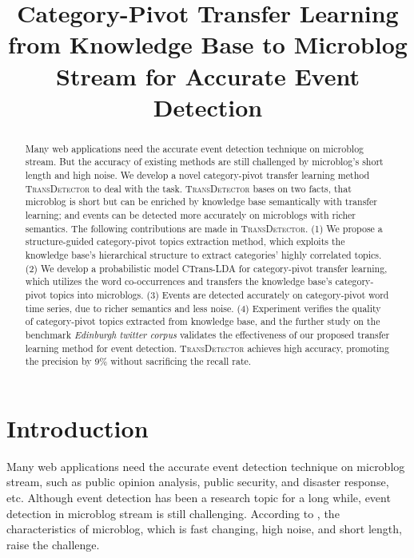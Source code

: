 \documentclass{article}
\begin{document}
%
\title{Category-Pivot Transfer Learning from Knowledge Base to Microblog Stream for Accurate Event Detection}
\maketitle

\begin{abstract}
Many web applications need the accurate event detection technique on microblog stream. 
But the accuracy of existing methods are still challenged by microblog's short length and high noise. 
We develop a novel category-pivot transfer learning method \textsc{TransDetector} to deal with the task.  
\textsc{TransDetector} bases on two facts, that microblog is short but can be enriched by knowledge base semantically with transfer learning; and events can be detected more accurately on microblogs with richer semantics.
The following contributions are made in \textsc{TransDetector}.
(1) We propose a structure-guided category-pivot topics extraction method, which exploits the knowledge base's hierarchical structure to extract categories' highly correlated topics. 
(2) We develop a probabilistic model CTrans-LDA for category-pivot transfer learning, which utilizes the word co-occurrences and transfers the knowledge base's category-pivot topics into microblogs. 
(3) Events are detected accurately on category-pivot word time series, due to richer semantics and less noise. 
(4) Experiment verifies the quality of category-pivot topics extracted from knowledge base, and the further study on the benchmark \textit{Edinburgh twitter corpus} validates the effectiveness of our proposed transfer learning method for event detection.
\textsc{TransDetector} achieves high accuracy, promoting the precision by 9\% without  sacrificing the recall rate.

\end{abstract}

\section{Introduction}
Many web applications need the accurate event detection technique on microblog stream, such as public opinion analysis\cite{thelwall2011sentiment}, public security\cite{Li:2012gw}, and disaster response\cite{Yin:2012ht}, etc.
Although event detection has been a research topic for a long while\cite{allan1998topic}, event detection in microblog stream is still challenging\cite{atefeh2015survey}.
According to \cite{huang2016probabilistic}, the characteristics of microblog, which is fast changing, high noise, and short length, raise the challenge.
\end{document}

